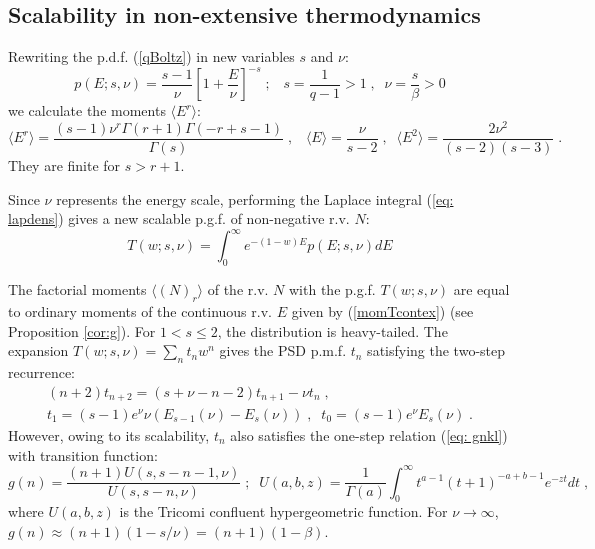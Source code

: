 \documentclass[a4paper,12pt]{amsart}
\theoremstyle{definition}
\theoremstyle{remark}
\begin{document}
\subsection{Scalability in non-extensive thermodynamics}
Rewriting the p.d.f. (\ref{qBoltz}) in new variables $s$ and $\nu$:
\begin{equation}\label{Tcontex}
 p(E;s,\nu)= \frac{s-1}{\nu}\left[1+\frac{E}{\nu}\right]^{-s}\;;\;\;\; s=\frac{1}{q-1}>1\;,\;\; \nu=\frac{s}{\beta}>0
\end{equation}
we calculate the moments $\langle E^r \rangle $:
\begin{equation}\label{momTcontex}
\langle E^r \rangle =\frac{(s-1) \nu ^r \Gamma (r+1) \Gamma (-r+s-1)}{\Gamma (s)}\;,\;\;\; \langle E \rangle =\frac{\nu}{s-2}\;,\;\;
\langle E^2 \rangle =\frac{2 \nu ^2}{(s-2)(s-3)}\;.
\end{equation}
They are finite for $s>r+1$. 

Since $\nu$ represents the energy scale, performing the Laplace integral (\ref{eq: lapdens}) gives a new scalable p.g.f. of non-negative r.v. $N$:
\[
T(w;s,\nu)=\int_0^{\infty}e^{-(1-w)E}p(E;s,\nu)dE
\]

The factorial moments $\langle (N)_r\rangle$ of the r.v. $N$ with the p.g.f. $T(w;s,\nu)$ are equal to ordinary moments of the continuous r.v. $E$ given by (\ref{momTcontex}) (see Proposition \ref{cor:g}). For $1<s \leq 2$, the distribution is heavy-tailed. The expansion $T(w;s,\nu)=\sum_n t_n w^n$ gives the PSD p.m.f. $t_n$ satisfying the two-step recurrence:
\begin{eqnarray}\label{Tsalpmf}
(n+2)t_{n+2}=(s+\nu-n-2)t_{n+1}-\nu t_n\;,\\
t_1=(s-1)e^{\nu } \nu  (E_{s-1}(\nu )-E_s(\nu ))\;,\;\; t_0=(s-1)e^{\nu} E_{s}(\nu) \nonumber \;.
\end{eqnarray}
However, owing to its scalability, $t_n$ also satisfies the one-step relation (\ref{eq: gnkl}) with transition function:
\[
g(n)=\frac{(n+1) U(s,s-n-1,\nu )}{U(s,s-n,\nu )}\;;\;\;U(a,b,z)=\frac{1}{\Gamma (a)}\int _0^{\infty }t^{a-1} (t+1)^{-a+b-1} e^{-zt}d t \;,
\]
where $U(a,b,z)$ is the Tricomi confluent hypergeometric function. For $\nu \to \infty$,  $g(n)\approx (n+1)(1-s/\nu)=(n+1)(1-\beta)$.
\end{document}

